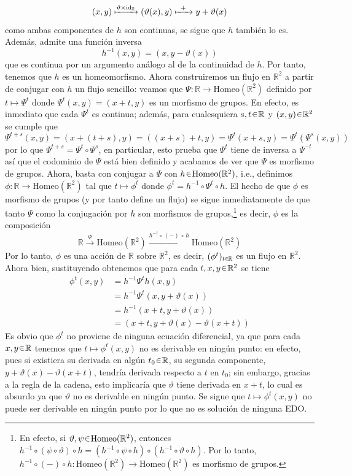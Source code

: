 \begin{sol}
\[
(x,y) \xmapsto{\vartheta \times \operatorname{id}_{\mathbb{R}}} (\vartheta(x), y) \xmapsto{\;\;+\;\;} y + \vartheta(x)
\]
como ambas componentes de $h$ son continuas, se sigue que $h$ también lo es.
Además, admite una función inversa
\[
h^{-1}(x,y) = (x, y-\vartheta(x))
\]
que es continua por un argumento análogo al de la continuidad de $h$. Por tanto, tenemos que $h$ es un homeomorfismo. Ahora construiremos un flujo en $\mathbb{R}^2$ a partir de conjugar con $h$ un flujo sencillo: veamos que $\Psi \colon \mathbb{R} \to \mathrm{Homeo}(\mathbb{R}^2)$ definido por $t \mapsto \Psi^t$ donde 
\(
\Psi^t(x,y) = (x+t,y) 
\)
es un morfismo de grupos. En efecto, es inmediato que cada $\Psi^t$ es continua; además, para cualesquiera $s,t \en \mathbb{R}$ y $(x,y) \en \mathbb{R}^2$ se cumple que 
\[
\Psi^{t+s}(x,y) = (x+(t+s), y) = ((x+s)+t, y) = \Psi^t(x+s,y) = \Psi^t(\Psi^s(x,y))  
\]
por lo que $\Psi^{t+s} = \Psi^t \circ \Psi^s$, en particular, esto prueba que $\Psi^t$ tiene de inversa a $\Psi^{-t}$ así que el codominio de $\Psi$ está bien definido y acabamos de ver que $\Psi$ es morfismo de grupos. Ahora, basta con conjugar a $\Psi$ con $h \en \mathrm{Homeo}(\mathbb{R}^2)$, i.e., definimos $\phi \colon \mathbb{R} \to \mathrm{Homeo}(\mathbb{R}^2)$ tal que $t \mapsto \phi^t$ donde $\phi^t = h^{-1} \circ \Psi^t \circ h$. El hecho de que $\phi$ es morfismo de grupos (y por tanto define un flujo) se sigue inmediatamente de que tanto $\Psi$ como la conjugación por $h$ son morfismos de grupos,\footnote{En efecto, si $\vartheta,\psi \en \mathrm{Homeo}(\mathbb{R}^2)$, entonces $h^{-1} \circ( \psi \circ \vartheta) \circ h = (h^{-1} \circ \psi \circ h) \circ (h^{-1} \circ \vartheta \circ h)$. Por lo tanto, $h^{-1} \circ (-) \circ h \colon \mathrm{Homeo}(\mathbb{R}^2) \to \mathrm{Homeo}(\mathbb{R}^2)$ es morfismo de grupos.} es decir, $\phi$ es la composición
\[
\mathbb{R} \xrightarrow{\Psi} \mathrm{Homeo}(\mathbb{R}^2) \xrightarrow{h^{-1} \circ\, {(-)} \,\circ\, h} \mathrm{Homeo}(\mathbb{R}^2)
\]
Por lo tanto, $\phi$ es una acción de $\mathbb{R}$ sobre $\mathbb{R}^2$, es decir, $(\phi^t)_{t \en \mathbb{R}}$ es un flujo en $\mathbb{R}^2$. Ahora bien, sustituyendo obtenemos que para cada $t,x,y \en \mathbb{R}^2$ se tiene
\begin{align*}
\phi^t(x,y)%
&= h^{-1}\Psi^th(x,y)\\
&= h^{-1}\Psi^t(x, y + \vartheta(x))\\
&= h^{-1}(x + t, y + \vartheta(x))\\
&= (x + t, y + \vartheta(x) - \vartheta(x + t))
\end{align*}
Es obvio que $\phi^t$ no proviene de ninguna ecuación diferencial, ya que para cada $x,y \en \mathbb{R}$ tenemos que $t \mapsto \phi^t(x,y)$ no es derivable en ningún punto: en efecto, pues si existiera su derivada en algún $t_0 \en \mathbb{R}$, su segunda componente, $y + \vartheta(x) - \vartheta(x+t)$, tendría derivada respecto a $t$ en $t_0$; sin embargo, gracias a la regla de la cadena, esto implicaría que $\vartheta$ tiene derivada en $x+t$, lo cual es absurdo ya que $\vartheta$ no es derivable en ningún punto. Se sigue que $t \mapsto \phi^t(x,y)$ no puede ser derivable en ningún punto por lo que no es solución de ninguna EDO.
\end{sol}

